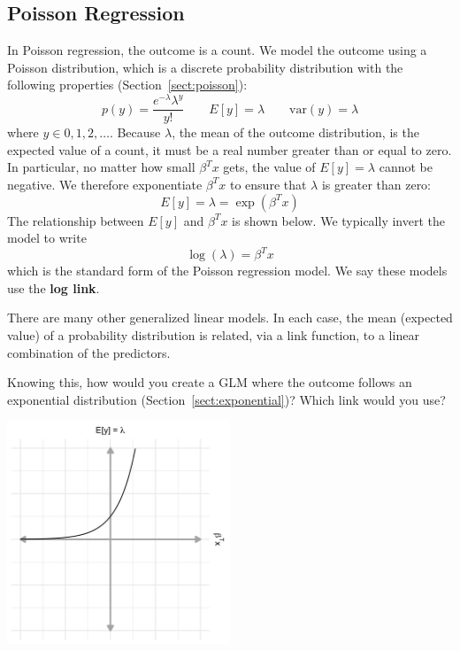 \subsection{Poisson Regression}

In Poisson regression, the outcome is a count. We model the outcome using a Poisson distribution, which is a discrete probability distribution with the following properties (Section~\ref{sect:poisson}):
$$ p(y) = \frac{e^{-\lambda} \lambda^y}{y!} \qquad E[y] = \lambda \qquad \text{var}(y) = \lambda $$
where $y \in 0, 1, 2, \dots$. Because $\lambda$, the mean of the outcome distribution, is the expected value of a count, it must be a real number greater than or equal to zero. In particular, no matter how small $\beta^T x$ gets, the value of $E[y] = \lambda$ cannot be negative. We therefore exponentiate $\beta^T x$ to ensure that $\lambda$ is greater than zero:
\begin{equation} E[y] = \lambda = \exp(\beta^T x) \label{eqn:meanpoisson} \end{equation}
The relationship between $E[y]$ and $\beta^T x$ is shown below. We typically invert the model to write
$$ \log(\lambda) = \beta^T x $$
which is the standard form of the Poisson regression model. We say these models use the \textbf{log link}.

\vspace{3mm}

\begin{question}{}
There are many other generalized linear models. In each case, the mean (expected value) of a probability distribution is related, via a link function, to a linear combination of the predictors. 

Knowing this, how would you create a GLM where the outcome follows an exponential distribution (Section~\ref{sect:exponential})? Which link would you use?
\end{question}

\begin{center}
\includegraphics[width=0.5\textwidth]{img/l02-figure3-poisson.png}
\end{center}

